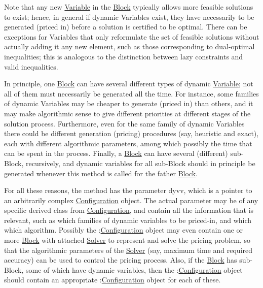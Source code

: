 Note that any new \mbox{\hyperlink{class_s_m_spp__di__unipi__it_1_1_variable}{Variable}} in the \mbox{\hyperlink{class_s_m_spp__di__unipi__it_1_1_block}{Block}} typically allows more feasible solutions to exist; hence, in general if dynamic Variables exist, they have necessarily to be generated (priced in) before a solution is certified to be optimal. There can be exceptions for Variables that only reformulate the set of feasible solutions without actually adding it any new element, such as those corresponding to dual-\/optimal inequalities; this is analogous to the distinction between lazy constraints and valid inequalities.

In principle, one \mbox{\hyperlink{class_s_m_spp__di__unipi__it_1_1_block}{Block}} can have several different types of dynamic \mbox{\hyperlink{class_s_m_spp__di__unipi__it_1_1_variable}{Variable}}; not all of them must necessarily be generated all the time. For instance, some families of dynamic Variables may be cheaper to generate (priced in) than others, and it may make algorithmic sense to give different priorities at different stages of the solution process. Furthermore, even for the same family of dynamic Variables there could be different generation (pricing) procedures (say, heuristic and exact), each with different algorithmic parameters, among which possibly the time that can be spent in the process. Finally, a \mbox{\hyperlink{class_s_m_spp__di__unipi__it_1_1_block}{Block}} can have several (different) sub-\/\+Block, recursively, and dynamic variables for all sub-\/\+Block should in principle be generated whenever this method is called for the father \mbox{\hyperlink{class_s_m_spp__di__unipi__it_1_1_block}{Block}}.

For all these reasons, the method has the parameter dyvv, which is a pointer to an arbitrarily complex \mbox{\hyperlink{class_s_m_spp__di__unipi__it_1_1_configuration}{Configuration}} object. The actual parameter may be of any specific derived class from \mbox{\hyperlink{class_s_m_spp__di__unipi__it_1_1_configuration}{Configuration}}, and contain all the information that is relevant, such as which families of dynamic variables to be priced-\/in, and which which algorithm. Possibly the \+:\mbox{\hyperlink{class_s_m_spp__di__unipi__it_1_1_configuration}{Configuration}} object may even contain one or more \mbox{\hyperlink{class_s_m_spp__di__unipi__it_1_1_block}{Block}} with attached \mbox{\hyperlink{class_s_m_spp__di__unipi__it_1_1_solver}{Solver}} to represent and solve the pricing problem, so that the algorithmic parameters of the \mbox{\hyperlink{class_s_m_spp__di__unipi__it_1_1_solver}{Solver}} (say, maximum time and required accuracy) can be used to control the pricing process. Also, if the \mbox{\hyperlink{class_s_m_spp__di__unipi__it_1_1_block}{Block}} has sub-\/\+Block, some of which have dynamic variables, then the \+:\mbox{\hyperlink{class_s_m_spp__di__unipi__it_1_1_configuration}{Configuration}} object should contain an appropriate \+:\mbox{\hyperlink{class_s_m_spp__di__unipi__it_1_1_configuration}{Configuration}} object for each of these.

